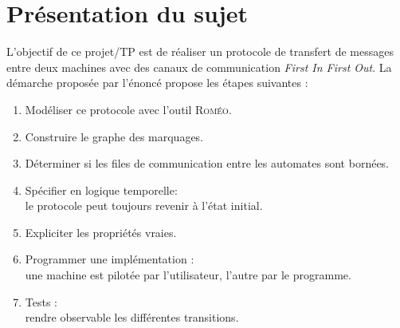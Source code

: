 \chapter{Présentation du sujet}\label{chap:Intro}
L'objectif de ce projet/TP est de réaliser un protocole de transfert de messages entre deux machines avec des canaux de communication \textit{First In First Out}. La démarche proposée par l'énoncé propose les  étapes  suivantes :

\begin{enumerate}
\item 
    Modéliser ce protocole avec l'outil \textsc{Roméo}.
  \item
    Construire le graphe des marquages.
  \item
    Déterminer si les files de communication entre les automates sont bornées.
  \item
    Spécifier en logique temporelle: \hfill \\
    le protocole peut toujours revenir à l’état initial.
  \item 
    Expliciter les propriétés vraies.
  \item
    Programmer une implémentation : \hfill \\
    une machine est pilotée par l'utilisateur, l'autre par le programme.
  \item
    Tests  :\hfill \\
    rendre observable les différentes transitions.
  \end{enumerate}


